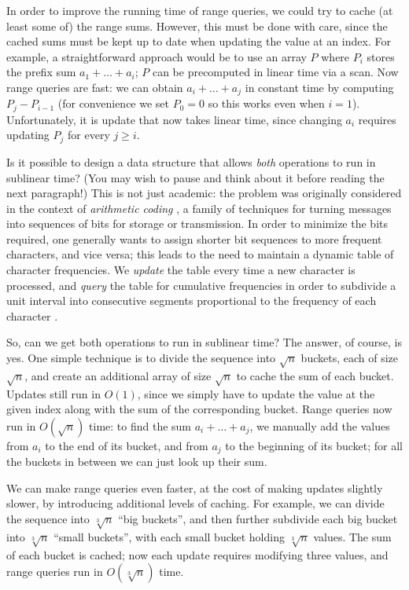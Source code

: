 \documentclass{jfp}
\renewcommand{\geq}{\geqslant}
\theoremstyle{definition}
\theoremstyle{remark}
\begin{document}
In order to improve the running time of range queries, we could try to
cache (at least some of) the range sums.  However, this must be done
with care, since the cached sums must be kept up to date when updating
the value at an index.  For example, a straightforward approach would
be to use an array $P$ where $P_i$ stores the prefix sum
$a_1 + \dots + a_i$; $P$ can be precomputed in linear time via a scan.
Now range queries are fast: we can obtain $a_i + \dots + a_j$ in
constant time by computing $P_j - P_{i-1}$ (for convenience we set
$P_0 = 0$ so this works even when $i=1$).  Unfortunately, it is update
that now takes linear time, since changing $a_i$ requires updating
$P_j$ for every $j \geq i$.

Is it possible to design a data structure that allows \emph{both}
operations to run in sublinear time?  (You may wish to pause and think
about it before reading the next paragraph!)  This is not just
academic: the problem was originally considered in the context of
\emph{arithmetic coding} \citep{rissanen1979arithmetic,
  bird2002arithmetic}, a family of techniques for turning messages
into sequences of bits for storage or transmission.  In order to
minimize the bits required, one generally wants to assign shorter bit
sequences to more frequent characters, and vice versa; this leads to
the need to maintain a dynamic table of character frequencies.  We
\emph{update} the table every time a new character is processed, and
\emph{query} the table for cumulative frequencies in order to
subdivide a unit interval into consecutive segments proportional to
the frequency of each character \citep{fenwick1994new, ryabko1989fast}.

So, can we get both operations to run in sublinear time?  The answer,
of course, is yes.  One simple technique is to divide the sequence
into $\sqrt n$ buckets, each of size $\sqrt n$, and create an
additional array of size $\sqrt n$ to cache the sum of each bucket.
Updates still run in $O(1)$, since we simply have to update the value
at the given index along with the sum of the corresponding bucket.
Range queries now run in $O(\sqrt n)$ time: to find the sum
$a_i + \dots + a_j$, we manually add the values from $a_i$ to the end
of its bucket, and from $a_j$ to the beginning of its bucket; for all
the buckets in between we can just look up their sum.

We can make range queries even faster, at the cost of making updates
slightly slower, by introducing additional levels of caching.  For
example, we can divide the sequence into $\sqrt[3] n$ ``big buckets'',
and then further subdivide each big bucket into $\sqrt[3] n$ ``small
buckets'', with each small bucket holding $\sqrt[3] n$ values.  The
sum of each bucket is cached; now each update requires modifying three
values, and range queries run in $O(\sqrt[3] n)$ time.
\end{document}
